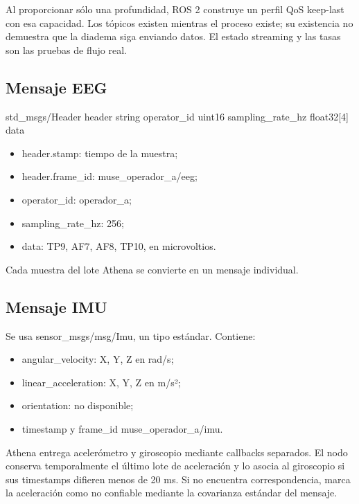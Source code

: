 \documentclass[11pt,a4paper]{article}
\begin{document}
Al proporcionar sólo una profundidad, ROS 2 construye un perfil QoS keep-last con esa capacidad. Los tópicos existen mientras el proceso existe; su existencia no demuestra que la diadema siga enviando datos. El estado {\ttfamily\small streaming} y las tasas son las pruebas de flujo real.

\subsection{Mensaje EEG}

\begin{MuseCode}
std_msgs/Header header
string operator_id
uint16 sampling_rate_hz
float32[4] data
\end{MuseCode}

\begin{itemize}
\item {\ttfamily\small header.stamp}: tiempo de la muestra;
\item {\ttfamily\small header.frame\_id}: {\ttfamily\small muse\_operador\_a/eeg};
\item {\ttfamily\small operator\_id}: {\ttfamily\small operador\_a};
\item {\ttfamily\small sampling\_rate\_hz}: 256;
\item {\ttfamily\small data}: TP9, AF7, AF8, TP10, en microvoltios.
\end{itemize}

Cada muestra del lote Athena se convierte en un mensaje individual.

\subsection{Mensaje IMU}

Se usa {\ttfamily\small sensor\_msgs/msg/Imu}, un tipo estándar. Contiene:

\begin{itemize}
\item {\ttfamily\small angular\_velocity}: X, Y, Z en rad/s;
\item {\ttfamily\small linear\_acceleration}: X, Y, Z en m/s²;
\item {\ttfamily\small orientation}: no disponible;
\item timestamp y {\ttfamily\small frame\_id} {\ttfamily\small muse\_operador\_a/imu}.
\end{itemize}

Athena entrega acelerómetro y giroscopio mediante callbacks separados. El nodo conserva temporalmente el último lote de aceleración y lo asocia al giroscopio si sus timestamps difieren menos de 20 ms. Si no encuentra correspondencia, marca la aceleración como no confiable mediante la covarianza estándar del mensaje.
\end{document}
